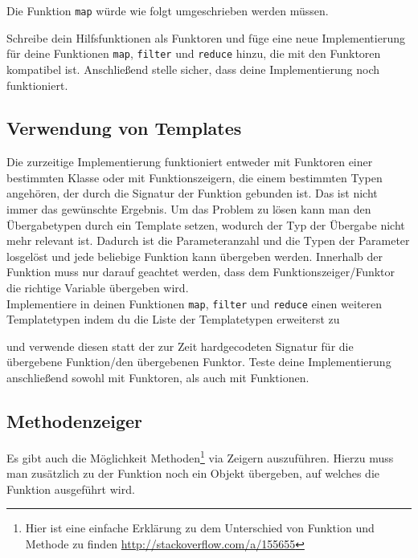 

Die Funktion \lstinline{map} würde wie folgt umgeschrieben werden müssen.



Schreibe dein Hilfsfunktionen als Funktoren und füge eine neue Implementierung für deine Funktionen \lstinline{map}, \lstinline{filter} und \lstinline{reduce} hinzu, die mit den Funktoren kompatibel ist.
Anschließend stelle sicher, dass deine Implementierung noch funktioniert.

\subsection{Verwendung von Templates}
\label{sec:functional_template}
Die zurzeitige Implementierung funktioniert entweder mit Funktoren einer bestimmten Klasse oder mit Funktionszeigern, die einem bestimmten Typen angehören, der durch die Signatur der Funktion gebunden ist.
Das ist nicht immer das gewünschte Ergebnis.
Um das Problem zu lösen kann man den Übergabetypen durch ein Template setzen, wodurch der Typ der Übergabe nicht mehr relevant ist.
Dadurch ist die Parameteranzahl und die Typen der Parameter losgelöst und jede beliebige Funktion kann übergeben werden.
Innerhalb der Funktion muss nur darauf geachtet werden, dass dem Funktionszeiger/Funktor die richtige Variable übergeben wird. \\

Implementiere in deinen Funktionen \lstinline{map}, \lstinline{filter} und \lstinline{reduce} einen weiteren Templatetypen indem du die Liste der Templatetypen erweiterst zu 



und verwende diesen statt der zur Zeit hardgecodeten Signatur für die übergebene Funktion/den übergebenen Funktor.
Teste deine Implementierung anschließend sowohl mit Funktoren, als auch mit Funktionen.

\subsection{Methodenzeiger}
\label{sec:functional_method}
Es gibt auch die Möglichkeit Methoden\footnote{Hier ist eine einfache Erklärung zu dem Unterschied von Funktion und Methode zu finden \url{http://stackoverflow.com/a/155655}} via Zeigern auszuführen.
Hierzu muss man zusätzlich zu der Funktion noch ein Objekt übergeben, auf welches die Funktion ausgeführt wird. \\

